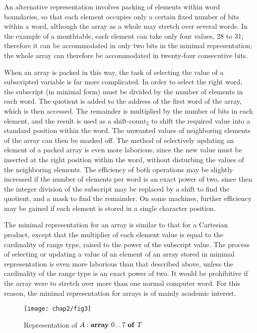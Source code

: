 An alternative representation involves packing of elements within word boundaries, so that each element occupies only a certain fixed number of bits within a word, although the array as a whole may stretch over several words. In the example of a monthtable, each element can take only four values, 28 to 31; therefore it can be accommodated in only two bits in the minimal representation; the whole array can therefore be accommodated in twenty-four consecutive bits.

When an array is packed in this way, the task of selecting the value of a subscripted variable is far more complicated. In order to select the right word, the subscript (in minimal form) must be divided by the number of elements in each word. The quotient is added to the address of the first word of the array, which is then accessed. The remainder is multiplied by the number of bits in each element, and the result is used as a $\text{shift-count}_2$ to shift the required value into a standard position within the word. The unwanted values of neighboring elements of the array can then be masked off. The method of selectively updating an element of a packed array is even more laborious, since the new value must be inserted at the right position within the word, without disturbing the values of the neighboring elements. The efficiency of both operations may be slightly increased if the number of elements per word is an exact power of two, since then the integer division of the subscript may be replaced by a shift to find the quotient, and a mask to find the remainder. On some machines, further efficiency may be gained if each element is stored in a single character position.

The minimal representation for an array is similar to that for a Cartesian product, except that the multiplier of each element value is equal to the cardinality of range type, raised to the power of the subscript value. The process of selecting or updating a value of an element of an array stored in minimal representation is even more laborious than that described above, unless the cardinality of the range type is an exact power of two. It would be prohibitive if the array were to stretch over more than one normal computer word. For this reason, the minimal representation for arrays is of mainly academic interest.

\begin{figure}[h]
	\centering
	\texttt{[image: chap2/fig3]}
	\caption{Representation of $A:\text{\textbf{array} } 0\,.\,.\,7 \text{ \textbf{of} } T$}
\end{figure}

